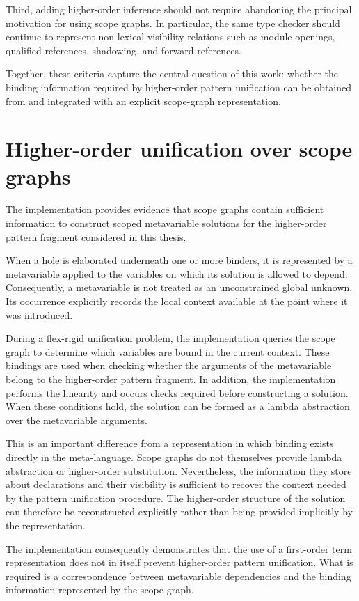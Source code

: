 Third, adding higher-order inference should not require abandoning the
principal motivation for using scope graphs. In particular, the same type
checker should continue to represent non-lexical visibility relations such as
module openings, qualified references, shadowing, and forward references.

Together, these criteria capture the central question of this work: whether
the binding information required by higher-order pattern unification can be
obtained from and integrated with an explicit scope-graph representation.

\section{Higher-order unification over scope graphs}
\label{sec:evaluation-hou}

The implementation provides evidence that scope graphs contain sufficient
information to construct scoped metavariable solutions for the higher-order
pattern fragment considered in this thesis.

When a hole is elaborated underneath one or more binders, it is represented by
a metavariable applied to the variables on which its solution is allowed to
depend. Consequently, a metavariable is not treated as an unconstrained global
unknown. Its occurrence explicitly records the local context available at the
point where it was introduced.

During a flex-rigid unification problem, the implementation queries the scope
graph to determine which variables are bound in the current context. These
bindings are used when checking whether the arguments of the metavariable
belong to the higher-order pattern fragment. In addition, the implementation
performs the linearity and occurs checks required before constructing a
solution. When these conditions hold, the solution can be formed as a lambda
abstraction over the metavariable arguments.

This is an important difference from a representation in which binding exists
directly in the meta-language. Scope graphs do not themselves provide lambda
abstraction or higher-order substitution. Nevertheless, the information they
store about declarations and their visibility is sufficient to recover the
context needed by the pattern unification procedure. The higher-order
structure of the solution can therefore be reconstructed explicitly rather
than being provided implicitly by the representation.

The implementation consequently demonstrates that the use of a first-order
term representation does not in itself prevent higher-order pattern
unification. What is required is a correspondence between metavariable
dependencies and the binding information represented by the scope graph.

